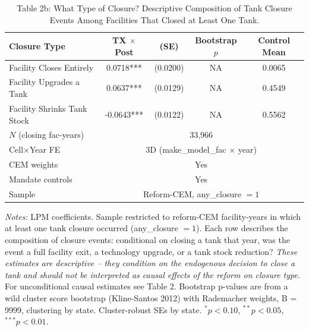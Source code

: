 \begin{table}[htbp]
\centering
\caption{Table 2b: What Type of Closure? Descriptive Composition of Tank Closure Events Among Facilities That Closed at Least One Tank.}
\label{tab:t2b_closure_conditional}
\begin{tabular}{lcccc}
\toprule
Closure Type & TX $\times$ Post & (SE) & Bootstrap $p$ & Control Mean \\
\midrule
Facility Closes Entirely & 0.0718*** & (0.0200) &   NA & 0.0065 \\
Facility Upgrades a Tank & 0.0637*** & (0.0129) &   NA & 0.4549 \\
Facility Shrinks Tank Stock & -0.0643*** & (0.0122) &   NA & 0.5562 \\
\midrule
$N$ (closing fac-years) & \multicolumn{4}{c}{33,966} \\
Cell$\times$Year FE & \multicolumn{4}{c}{3D (make\_model\_fac $\times$ year)} \\
CEM weights          & \multicolumn{4}{c}{Yes} \\
Mandate controls     & \multicolumn{4}{c}{Yes} \\
Sample               & \multicolumn{4}{c}{Reform-CEM, any\_closure $= 1$} \\
\bottomrule
\end{tabular}
\begin{minipage}{\linewidth}
\small
\textit{Notes:} LPM coefficients. Sample restricted to reform-CEM facility-years in which at least one tank closure occurred (any\_closure $= 1$). Each row describes the composition of closure events: conditional on closing a tank that year, was the event a full facility exit, a technology upgrade, or a tank stock reduction? \textit{These estimates are descriptive -- they condition on the endogenous decision to close a tank and should not be interpreted as causal effects of the reform on closure type.} For unconditional causal estimates see Table 2. Bootstrap p-values are from a wild cluster score bootstrap (Kline-Santos 2012) with Rademacher weights, B = 9999, clustering by state. Cluster-robust SEs by state. $^{*}p<0.10$, $^{**}p<0.05$, $^{***}p<0.01$.
\end{minipage}
\end{table}
